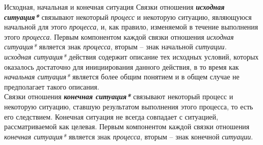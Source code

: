 \begin{frame}{\large Исходная, начальная и конечная ситуация}
\vspace{20}
Связки отношения \textit{\textbf{исходная ситуация*}} связывают некоторый \textit{процесс} и некоторую ситуацию, являющуюся начальной для этого \textit{процесса}, и, как правило, изменяемой в течение выполнения этого \textit{процесса}.
    Первым компонентом каждой связки отношения \textit{исходная ситуация*} является знак \textit{процесса}, вторым – знак начальной \textit{ситуации.}\\
    \textit{исходная ситуация*} действия содержит описание тех исходных условий, которых оказалось достаточно для инициирования данного действия, в то время как \textit{начальная ситуация*} является более общим понятием и в общем случае не предполагает такого описания.\\
    Связки отношения \textit{\textbf{конечная ситуация*}} связывают некоторый процесс и некоторую ситуацию, ставшую результатом выполнения этого процесса, то есть его следствием. Конечная ситуация не всегда совпадает с ситуацией, рассматриваемой как целевая.
Первым компонентом каждой связки отношения \textit{конечная ситуация*} является знак \textit{процесса}, вторым – знак конечной \textit{ситуации}.
\end{frame}
